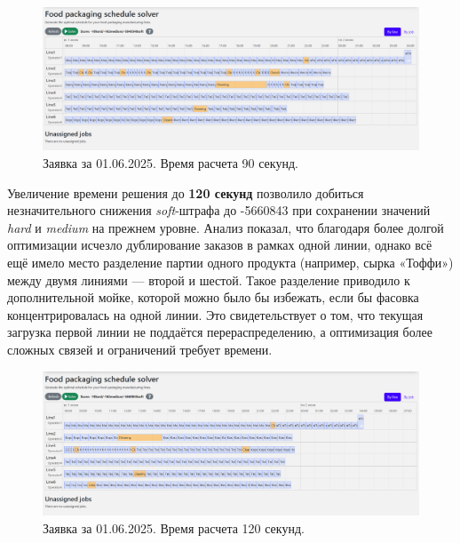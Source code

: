 \begin{figure}[ht]
 \centering
        \includegraphics[height = 6 cm, keepaspectratio]{../assets/images/tests/90sec_01.png}
		\caption{Заявка за 01.06.2025. Время расчета 90 секунд.}
		\label{fig:quarkus_90sec_01}
\end{figure}

Увеличение времени решения до \textbf{120 секунд} позволило добиться незначительного снижения \textit{soft}-штрафа до -5660843 при сохранении значений \textit{hard} и \textit{medium} на прежнем уровне. Анализ показал, что благодаря более долгой оптимизации исчезло дублирование заказов в рамках одной линии, однако всё ещё имело место разделение партии одного продукта (например, сырка «Тоффи») между двумя линиями — второй и шестой. Такое разделение приводило к дополнительной мойке, которой можно было бы избежать, если бы фасовка концентрировалась на одной линии. Это свидетельствует о том, что текущая загрузка первой линии не поддаётся перераспределению, а оптимизация более сложных связей и ограничений требует времени.

\begin{figure}[ht]
 \centering
        \includegraphics[height = 6 cm, keepaspectratio]{../assets/images/tests/120sec_01.png}
		\caption{Заявка за 01.06.2025. Время расчета 120 секунд.}
		\label{fig:quarkus_120sec_01}
\end{figure}


